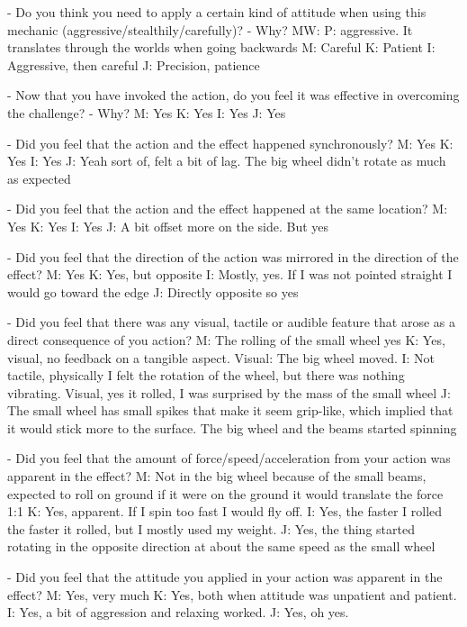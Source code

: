     - Do you think you need to apply a certain kind of attitude when using this mechanic (aggressive/stealthily/carefully)?
     - Why?
   MW: P: aggressive. It translates through the worlds when going backwards
   M: Careful
   K: Patient
   I: Aggressive, then careful
   J: Precision, patience

  - Now that you have invoked the action, do you feel it was effective in overcoming the challenge?
   - Why?
   M: Yes
   K: Yes
   I: Yes
   J: Yes

    - Did you feel that the action and the effect happened synchronously?
    M: Yes
    K: Yes
    I: Yes
    J: Yeah sort of, felt a bit of lag. The big wheel didn't rotate as much as expected

    - Did you feel that the action and the effect happened at the same location?
    M: Yes
    K: Yes
    I: Yes
    J: A bit offset more on the side. But yes

    - Did you feel that the direction of the action was mirrored in the direction of the effect?
    M: Yes
    K: Yes, but opposite
    I: Mostly, yes. If I was not pointed straight I would go toward the edge
    J: Directly opposite so yes

    - Did you feel that there was any visual, tactile or audible feature that arose as a direct consequence of you action?
    M: The rolling of the small wheel yes
    K: Yes, visual, no feedback on a tangible aspect. Visual: The big wheel moved.
    I: Not tactile, physically I felt the rotation of the wheel, but there was nothing vibrating. Visual, yes it rolled, I was surprised by the mass of the small wheel
    J: The small wheel has small spikes that make it seem grip-like, which implied that it would stick more to the surface. The big wheel and the beams started spinning

    - Did you feel that the amount of force/speed/acceleration from your action was apparent in the effect?
    M: Not in the big wheel because of the small beams, expected to roll on ground if it were on the ground it would translate the force 1:1
    K: Yes, apparent. If I spin too fast I would fly off.
    I: Yes, the faster I rolled the faster it rolled, but I mostly used my weight.
    J: Yes, the thing started rotating in the opposite direction at about the same speed as the small wheel

    - Did you feel that the attitude you applied in your action was apparent in the effect?
    M: Yes, very much
    K: Yes, both when attitude was unpatient and patient.
    I: Yes, a bit of aggression and relaxing worked.
    J: Yes, oh yes.


